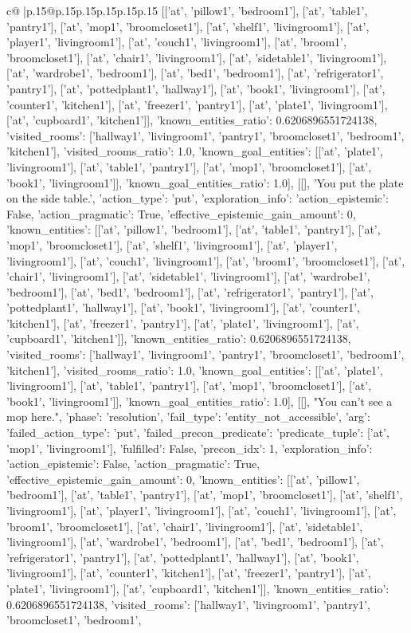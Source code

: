 \documentclass{article}
\begin{document}
{\begin{supertabular}{c@{$\;$}|p{.15\linewidth}@{}p{.15\linewidth}p{.15\linewidth}p{.15\linewidth}p{.15\linewidth}p{.15\linewidth}}
{{{[['at', 'pillow1', 'bedroom1'], ['at', 'table1', 'pantry1'], ['at', 'mop1', 'broomcloset1'], ['at', 'shelf1', 'livingroom1'], ['at', 'player1', 'livingroom1'], ['at', 'couch1', 'livingroom1'], ['at', 'broom1', 'broomcloset1'], ['at', 'chair1', 'livingroom1'], ['at', 'sidetable1', 'livingroom1'], ['at', 'wardrobe1', 'bedroom1'], ['at', 'bed1', 'bedroom1'], ['at', 'refrigerator1', 'pantry1'], ['at', 'pottedplant1', 'hallway1'], ['at', 'book1', 'livingroom1'], ['at', 'counter1', 'kitchen1'], ['at', 'freezer1', 'pantry1'], ['at', 'plate1', 'livingroom1'], ['at', 'cupboard1', 'kitchen1']], 'known_entities_ratio': 0.6206896551724138, 'visited_rooms': ['hallway1', 'livingroom1', 'pantry1', 'broomcloset1', 'bedroom1', 'kitchen1'], 'visited_rooms_ratio': 1.0, 'known_goal_entities': [['at', 'plate1', 'livingroom1'], ['at', 'table1', 'pantry1'], ['at', 'mop1', 'broomcloset1'], ['at', 'book1', 'livingroom1']], 'known_goal_entities_ratio': 1.0}}], [[], 'You put the plate on the side table.', {'action_type': 'put', 'exploration_info': {'action_epistemic': False, 'action_pragmatic': True, 'effective_epistemic_gain_amount': 0, 'known_entities': [['at', 'pillow1', 'bedroom1'], ['at', 'table1', 'pantry1'], ['at', 'mop1', 'broomcloset1'], ['at', 'shelf1', 'livingroom1'], ['at', 'player1', 'livingroom1'], ['at', 'couch1', 'livingroom1'], ['at', 'broom1', 'broomcloset1'], ['at', 'chair1', 'livingroom1'], ['at', 'sidetable1', 'livingroom1'], ['at', 'wardrobe1', 'bedroom1'], ['at', 'bed1', 'bedroom1'], ['at', 'refrigerator1', 'pantry1'], ['at', 'pottedplant1', 'hallway1'], ['at', 'book1', 'livingroom1'], ['at', 'counter1', 'kitchen1'], ['at', 'freezer1', 'pantry1'], ['at', 'plate1', 'livingroom1'], ['at', 'cupboard1', 'kitchen1']], 'known_entities_ratio': 0.6206896551724138, 'visited_rooms': ['hallway1', 'livingroom1', 'pantry1', 'broomcloset1', 'bedroom1', 'kitchen1'], 'visited_rooms_ratio': 1.0, 'known_goal_entities': [['at', 'plate1', 'livingroom1'], ['at', 'table1', 'pantry1'], ['at', 'mop1', 'broomcloset1'], ['at', 'book1', 'livingroom1']], 'known_goal_entities_ratio': 1.0}}], [[], "You can't see a mop here.", {'phase': 'resolution', 'fail_type': 'entity_not_accessible', 'arg': {'failed_action_type': 'put', 'failed_precon_predicate': {'predicate_tuple': ['at', 'mop1', 'livingroom1'], 'fulfilled': False, 'precon_idx': 1}}, 'exploration_info': {'action_epistemic': False, 'action_pragmatic': True, 'effective_epistemic_gain_amount': 0, 'known_entities': [['at', 'pillow1', 'bedroom1'], ['at', 'table1', 'pantry1'], ['at', 'mop1', 'broomcloset1'], ['at', 'shelf1', 'livingroom1'], ['at', 'player1', 'livingroom1'], ['at', 'couch1', 'livingroom1'], ['at', 'broom1', 'broomcloset1'], ['at', 'chair1', 'livingroom1'], ['at', 'sidetable1', 'livingroom1'], ['at', 'wardrobe1', 'bedroom1'], ['at', 'bed1', 'bedroom1'], ['at', 'refrigerator1', 'pantry1'], ['at', 'pottedplant1', 'hallway1'], ['at', 'book1', 'livingroom1'], ['at', 'counter1', 'kitchen1'], ['at', 'freezer1', 'pantry1'], ['at', 'plate1', 'livingroom1'], ['at', 'cupboard1', 'kitchen1']], 'known_entities_ratio': 0.6206896551724138, 'visited_rooms': ['hallway1', 'livingroom1', 'pantry1', 'broomcloset1', 'bedroom1', }}}
\end{supertabular}}
\end{document}
